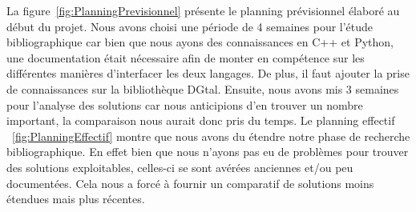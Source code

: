 \documentclass[11pt, french, screen]{report-rd-info}
\begin{document}
La figure~\ref{fig:PlanningPrevisionnel} présente le planning prévisionnel élaboré au début du projet. Nous avons choisi une période de 4 semaines pour l'étude bibliographique car bien que nous ayons des connaissances en C++ et Python, une documentation était nécessaire afin de monter en compétence sur les différentes manières d'interfacer les deux langages. De plus, il faut ajouter la prise de connaissances sur la bibliothèque DGtal. Ensuite, nous avons mis 3 semaines pour l'analyse des solutions car nous anticipions d'en trouver un nombre important, la comparaison nous aurait donc pris du temps. Le planning effectif ~\ref{fig:PlanningEffectif} montre que nous avons du étendre notre phase de recherche bibliographique. En effet bien que nous n'ayons pas eu de problèmes pour trouver des solutions exploitables, celles-ci se sont avérées anciennes et/ou peu documentées. Cela nous a forcé à fournir un comparatif de solutions moins étendues mais plus récentes.
\end{document}
